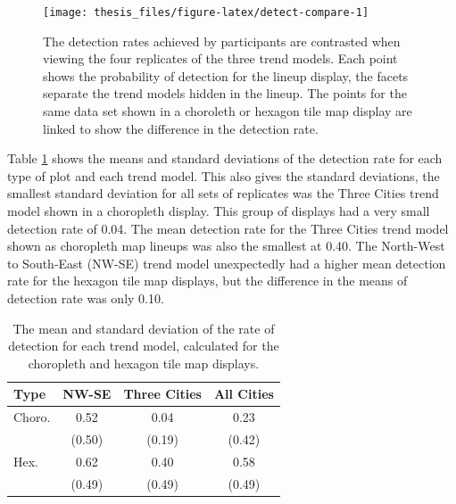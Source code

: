 \documentclass{monashthesis}
\begin{document}
\begin{figure}

{\centering \texttt{[image: thesis\_files/figure-latex/detect-compare-1]} 

}

\caption{The detection rates achieved by participants are contrasted when viewing the four replicates of the three trend models. Each point shows the probability of detection for the lineup display, the facets separate the trend models hidden in the lineup. The points for the same data set shown in a choroleth or hexagon tile map display are linked to show the difference in the detection rate.}\label{fig:detect-compare}
\end{figure}

Table \ref{tab:desc-stats} shows the means and standard deviations of the detection rate for each type of plot and each trend model. This also gives the standard deviations, the smallest standard deviation for all sets of replicates was the Three Cities trend model shown in a choropleth display. This group of displays had a very small detection rate of 0.04. The mean detection rate for the Three Cities trend model shown as choropleth map lineups was also the smallest at 0.40.
The North-West to South-East (NW-SE) trend model unexpectedly had a higher mean detection rate for the hexagon tile map displays, but the difference in the means of detection rate was only 0.10.

\begin{table}[!h]

\caption{\label{tab:desc-stats}The mean and standard deviation of the rate of detection for each trend model, calculated for the choropleth and hexagon tile map displays.}
\centering
\begin{tabular}[t]{lccc}
\toprule
Type & NW-SE & Three Cities & All Cities\\
\midrule
Choro. & 0.52 & 0.04 & 0.23\\
 & (0.50) & (0.19) & (0.42)\\
\addlinespace
Hex. & 0.62 & 0.40 & 0.58\\
 & (0.49) & (0.49) & (0.49)\\
\bottomrule
\end{tabular}
\end{table}
\end{document}
